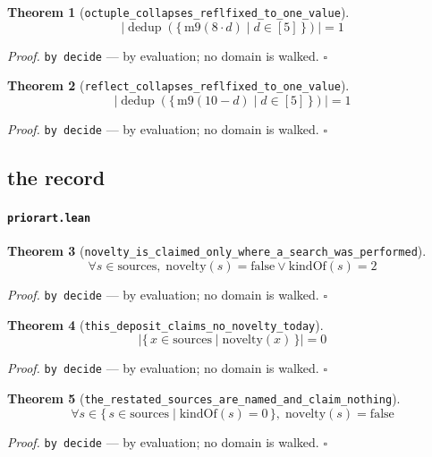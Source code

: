 \documentclass[11pt]{article}
\newtheorem{theorem}{Theorem}[section]
\begin{document}
\begin{theorem}[\texttt{octuple\_collapses\_reflfixed\_to\_one\_value}]
\[ \left|\operatorname{dedup}\left(\{\, \mathrm{m9}\mathopen{}\left(8 \cdot d\right) \mid d \in [5] \,\}\right)\right| = 1 \]
\end{theorem}
\noindent\emph{Proof.} \texttt{by decide} --- by evaluation; no domain is walked. \hfill$\square$

\begin{theorem}[\texttt{reflect\_collapses\_reflfixed\_to\_one\_value}]
\[ \left|\operatorname{dedup}\left(\{\, \mathrm{m9}\mathopen{}\left(10 - d\right) \mid d \in [5] \,\}\right)\right| = 1 \]
\end{theorem}
\noindent\emph{Proof.} \texttt{by decide} --- by evaluation; no domain is walked. \hfill$\square$

\subsection{the record}

\paragraph{\texttt{priorart.lean}}

\begin{theorem}[\texttt{novelty\_is\_claimed\_only\_where\_a\_search\_was\_performed}]
\[ \forall s \in \mathrm{sources},\; \mathrm{novelty}\mathopen{}\left(s\right) = \mathrm{false} \lor \mathrm{kindOf}\mathopen{}\left(s\right) = 2 \]
\end{theorem}
\noindent\emph{Proof.} \texttt{by decide} --- by evaluation; no domain is walked. \hfill$\square$

\begin{theorem}[\texttt{this\_deposit\_claims\_no\_novelty\_today}]
\[ \left|\{\, x \in \mathrm{sources} \mid \mathrm{novelty}\mathopen{}\left(x\right) \,\}\right| = 0 \]
\end{theorem}
\noindent\emph{Proof.} \texttt{by decide} --- by evaluation; no domain is walked. \hfill$\square$

\begin{theorem}[\texttt{the\_restated\_sources\_are\_named\_and\_claim\_nothing}]
\[ \forall s \in \{\, s \in \mathrm{sources} \mid \mathrm{kindOf}\mathopen{}\left(s\right) = 0 \,\},\; \mathrm{novelty}\mathopen{}\left(s\right) = \mathrm{false} \]
\end{theorem}
\noindent\emph{Proof.} \texttt{by decide} --- by evaluation; no domain is walked. \hfill$\square$
\end{document}
